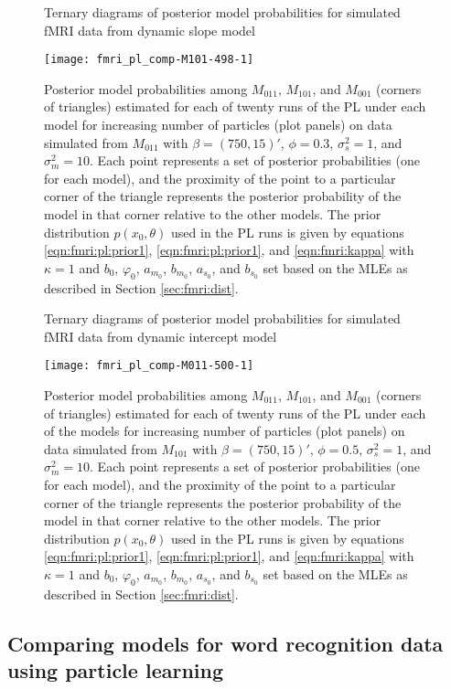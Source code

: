 \begin{figure}
\ssp
\centering
\caption{Ternary diagrams of posterior model probabilities for simulated fMRI data from dynamic slope model} \label{fig:fmri:comp:M011}
\texttt{[image: fmri\_pl\_comp-M101-498-1]}
\caption*{Posterior model probabilities among $M_{011}$, $M_{101}$, and $M_{001}$ (corners of triangles) estimated for each of twenty runs of the PL under each model for increasing number of particles (plot panels) on data simulated from $M_{011}$ with $\beta = (750,15)'$, $\phi = 0.3$, $\sigma^2_s = 1$, and $\sigma^2_m = 10$. Each point represents a set of posterior probabilities (one for each model), and the proximity of the point to a particular corner of the triangle represents the posterior probability of the model in that corner relative to the other models. The prior distribution $p(x_0,\theta)$ used in the PL runs is given by equations \eqref{eqn:fmri:pl:prior1}, \eqref{eqn:fmri:pl:prior1}, and \eqref{eqn:fmri:kappa} with $\kappa = 1$ and $b_0$, $\varphi_0$, $a_{m_0}$, $b_{m_0}$, $a_{s_0}$, and $b_{s_0}$ set based on the MLEs as described in Section \ref{sec:fmri:dist}.}
\end{figure}

\begin{figure}
\ssp
\centering
\caption{Ternary diagrams of posterior model probabilities for simulated fMRI data from dynamic intercept model} \label{fig:fmri:comp:M101}
\texttt{[image: fmri\_pl\_comp-M011-500-1]}
\caption*{Posterior model probabilities among $M_{011}$, $M_{101}$, and $M_{001}$ (corners of triangles) estimated for each of twenty runs of the PL under each of the models for increasing number of particles (plot panels) on data simulated from $M_{101}$ with $\beta = (750,15)'$, $\phi = 0.5$, $\sigma^2_s = 1$, and $\sigma^2_m = 10$. Each point represents a set of posterior probabilities (one for each model), and the proximity of the point to a particular corner of the triangle represents the posterior probability of the model in that corner relative to the other models. The prior distribution $p(x_0,\theta)$ used in the PL runs is given by equations \eqref{eqn:fmri:pl:prior1}, \eqref{eqn:fmri:pl:prior1}, and \eqref{eqn:fmri:kappa} with $\kappa = 1$ and $b_0$, $\varphi_0$, $a_{m_0}$, $b_{m_0}$, $a_{s_0}$, and $b_{s_0}$ set based on the MLEs as described in Section \ref{sec:fmri:dist}.}
\end{figure}

\subsection{Comparing models for word recognition data using particle learning \label{sec:fmri:real}}

